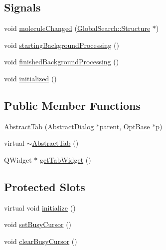 \subsection*{Signals}
\begin{DoxyCompactItemize}
\item 
void \hyperlink{classGlobalSearch_1_1AbstractTab_a343c4e401d69ec8364c5a0d53602bb02}{molecule\-Changed} (\hyperlink{classGlobalSearch_1_1Structure}{Global\-Search\-::\-Structure} $\ast$)
\item 
void \hyperlink{classGlobalSearch_1_1AbstractTab_a873c603fd50a66b14d47307aeaaa5fc8}{starting\-Background\-Processing} ()
\item 
void \hyperlink{classGlobalSearch_1_1AbstractTab_a5b06b32887aa1ba75cfcfad24f9c9a86}{finished\-Background\-Processing} ()
\item 
void \hyperlink{classGlobalSearch_1_1AbstractTab_aed63eed75abeb8c0e1e87344225f95cd}{initialized} ()
\end{DoxyCompactItemize}
\subsection*{Public Member Functions}
\begin{DoxyCompactItemize}
\item 
\hyperlink{classGlobalSearch_1_1AbstractTab_aead424f45ea35bc3b8d5d57dc64a9d70}{Abstract\-Tab} (\hyperlink{classGlobalSearch_1_1AbstractDialog}{Abstract\-Dialog} $\ast$parent, \hyperlink{classGlobalSearch_1_1OptBase}{Opt\-Base} $\ast$p)
\item 
virtual \hyperlink{classGlobalSearch_1_1AbstractTab_ab1c9b883cf4fc56d38045028600e20b7}{$\sim$\-Abstract\-Tab} ()
\item 
Q\-Widget $\ast$ \hyperlink{classGlobalSearch_1_1AbstractTab_a2ee691faf240a36dafde7620dc9a9293}{get\-Tab\-Widget} ()
\end{DoxyCompactItemize}
\subsection*{Protected Slots}
\begin{DoxyCompactItemize}
\item 
virtual void \hyperlink{classGlobalSearch_1_1AbstractTab_a70d03cb6f128710bd2af11a7915acad4}{initialize} ()
\item 
void \hyperlink{classGlobalSearch_1_1AbstractTab_a4c6f7ae72bcc7e1eaf06734b7ccb8635}{set\-Busy\-Cursor} ()
\item 
void \hyperlink{classGlobalSearch_1_1AbstractTab_a32efcb7e485b106fc728f39d3174df0e}{clear\-Busy\-Cursor} ()
\end{DoxyCompactItemize}
